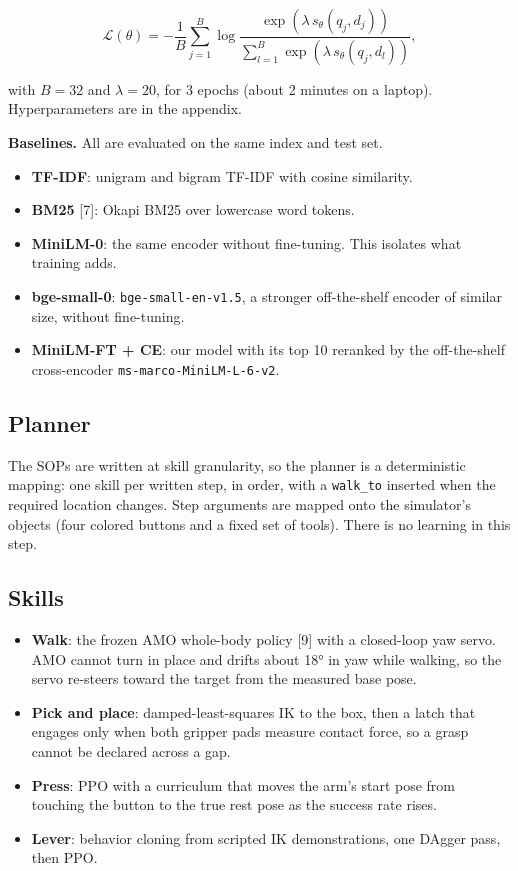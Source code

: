 \documentclass[
  10pt,
  twocolumn]{article}
\providecommand{\tightlist}{%
  \setlength{\itemsep}{0pt}\setlength{\parskip}{0pt}}
\begin{document}
\[\mathcal{L}(\theta) = -\frac{1}{B} \sum_{j=1}^{B} \log \frac{\exp(\lambda\, s_\theta(q_j, d_j))}{\sum_{l=1}^{B} \exp(\lambda\, s_\theta(q_j, d_l))},\]

with \(B = 32\) and \(\lambda = 20\), for 3 epochs (about 2 minutes on a
laptop). Hyperparameters are in the appendix.

\textbf{Baselines.} All are evaluated on the same index and test set.

\begin{itemize}
\tightlist
\item
  \textbf{TF-IDF}: unigram and bigram TF-IDF with cosine similarity.
\item
  \textbf{BM25} {[}7{]}: Okapi BM25 over lowercase word tokens.
\item
  \textbf{MiniLM-0}: the same encoder without fine-tuning. This isolates
  what training adds.
\item
  \textbf{bge-small-0}: \texttt{bge-small-en-v1.5}, a stronger
  off-the-shelf encoder of similar size, without fine-tuning.
\item
  \textbf{MiniLM-FT + CE}: our model with its top 10 reranked by the
  off-the-shelf cross-encoder \texttt{ms-marco-MiniLM-L-6-v2}.
\end{itemize}

\subsection{Planner}\label{planner}

The SOPs are written at skill granularity, so the planner is a
deterministic mapping: one skill per written step, in order, with a
\texttt{walk\_to} inserted when the required location changes. Step
arguments are mapped onto the simulator's objects (four colored buttons
and a fixed set of tools). There is no learning in this step.

\subsection{Skills}\label{skills}

\begin{itemize}
\tightlist
\item
  \textbf{Walk}: the frozen AMO whole-body policy {[}9{]} with a
  closed-loop yaw servo. AMO cannot turn in place and drifts about 18°
  in yaw while walking, so the servo re-steers toward the target from
  the measured base pose.
\item
  \textbf{Pick and place}: damped-least-squares IK to the box, then a
  latch that engages only when both gripper pads measure contact force,
  so a grasp cannot be declared across a gap.
\item
  \textbf{Press}: PPO with a curriculum that moves the arm's start pose
  from touching the button to the true rest pose as the success rate
  rises.
\item
  \textbf{Lever}: behavior cloning from scripted IK demonstrations, one
  DAgger pass, then PPO.
\end{itemize}
\end{document}
